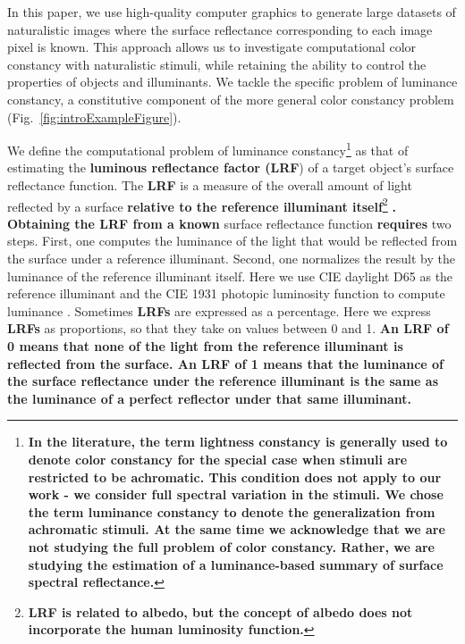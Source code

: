 \documentclass{jov}
\providecommand{\DIFaddtex}[1]{{\bf #1}} %
\providecommand{\DIFdeltex}[1]{} %
\providecommand{\DIFaddbegin}{} %
\providecommand{\DIFaddend}{} %
\providecommand{\DIFdelbegin}{} %
\providecommand{\DIFdelend}{} %
\providecommand{\DIFadd}[1]{\texorpdfstring{\DIFaddtex{#1}}{#1}} %
\providecommand{\DIFdel}[1]{\texorpdfstring{\DIFdeltex{#1}}{}} %
\newcommand{\DIFscaledelfig}{0.5}
\newlength{\DIFdelgraphicswidth} %
\newlength{\DIFdelgraphicsheight} %
\newcommand{\DIFaddincludegraphics}[2][]{{\color{blue}\fbox{\DIFOincludegraphics[#1]{#2}}}} %
\newcommand{\DIFdelincludegraphics}[2][]{%
\sbox{\DIFdelgraphicsbox}{\DIFOincludegraphics[#1]{#2}}%
\settoboxwidth{\DIFdelgraphicswidth}{\DIFdelgraphicsbox} %
\settoboxtotalheight{\DIFdelgraphicsheight}{\DIFdelgraphicsbox} %
\scalebox{\DIFscaledelfig}{%
\parbox[b]{\DIFdelgraphicswidth}{\usebox{\DIFdelgraphicsbox}\\[-\baselineskip] \rule{\DIFdelgraphicswidth}{0em}}\llap{\resizebox{\DIFdelgraphicswidth}{\DIFdelgraphicsheight}{%
\setlength{\unitlength}{\DIFdelgraphicswidth}%
\begin{picture}(1,1)%
\thicklines\linethickness{2pt} %
{\color[rgb]{1,0,0}\put(0,0){\framebox(1,1){}}}%
{\color[rgb]{1,0,0}\put(0,0){\line( 1,1){1}}}%
{\color[rgb]{1,0,0}\put(0,1){\line(1,-1){1}}}%
\end{picture}%
}\hspace*{3pt}}} %
} %
\DeclareRobustCommand{\DIFaddbegin}{\DIFOaddbegin \let\includegraphics\DIFaddincludegraphics} %
\DeclareRobustCommand{\DIFaddend}{\DIFOaddend \let\includegraphics\DIFOincludegraphics} %
\DeclareRobustCommand{\DIFdelbegin}{\DIFOdelbegin \let\includegraphics\DIFdelincludegraphics} %
\DeclareRobustCommand{\DIFdelend}{\DIFOaddend \let\includegraphics\DIFOincludegraphics} %
\begin{document}
In this paper, we use high-quality computer graphics to generate large datasets of naturalistic images where the surface reflectance corresponding to each image pixel is known. 
This approach allows us to investigate computational color constancy with naturalistic stimuli, while retaining the ability to control the properties of objects and illuminants. We tackle the specific problem of luminance constancy, a constitutive component of the more general color constancy problem (Fig.~\ref{fig:introExampleFigure}). 

We define the computational problem of luminance constancy\DIFaddbegin \footnote{\DIFadd{In the literature, the term lightness constancy is generally used to denote color constancy for the special case when stimuli are restricted to be achromatic. This condition does not apply to our work - we consider full spectral variation in the stimuli. We chose the term luminance constancy to denote the generalization from achromatic stimuli. At the same time we acknowledge that we are not studying the full problem of color constancy. Rather, we are studying the estimation of a luminance-based summary of surface spectral reflectance.}} \DIFaddend as that of estimating the \DIFdelbegin \DIFdel{light reflectance value (LRV}\DIFdelend \DIFaddbegin \DIFadd{luminous reflectance factor (LRF}\DIFaddend ) of a target object's surface reflectance function.
The \DIFdelbegin \DIFdel{LRV }\DIFdelend \DIFaddbegin \DIFadd{LRF }\DIFaddend is a measure of the overall amount of light reflected by a surface \DIFdelbegin \DIFdel{\cite{astm1121477}.
Estimating the LRV from a }\DIFdelend \DIFaddbegin \DIFadd{relative to the reference illuminant itself}\footnote{\DIFadd{LRF is related to albedo, but the concept of albedo does not incorporate the human luminosity function.}} \DIFadd{\cite{astm1121477}.
Obtaining the LRF from a known }\DIFaddend surface reflectance function \DIFdelbegin \DIFdel{proceeds in }\DIFdelend \DIFaddbegin \DIFadd{requires }\DIFaddend two steps.
First, one computes the luminance of the light that would be reflected from the surface under a reference illuminant.
Second, one normalizes the result by the luminance of the reference illuminant itself.
Here we use CIE daylight D65 as the reference illuminant and the CIE 1931 photopic luminosity function to compute luminance \cite{CIE86}.
Sometimes \DIFdelbegin \DIFdel{LRVs }\DIFdelend \DIFaddbegin \DIFadd{LRFs }\DIFaddend are expressed as a percentage.
Here we express \DIFdelbegin \DIFdel{LRVs }\DIFdelend \DIFaddbegin \DIFadd{LRFs }\DIFaddend as proportions, so that they take on values between 0 and 1. 
\DIFaddbegin \DIFadd{An LRF of 0 means that none of the light from the reference illuminant is reflected from the surface. 
An LRF of 1 means that the luminance of the surface reflectance under the reference illuminant is the same as the luminance of a perfect reflector under that same illuminant.
}\DIFaddend 
\end{document}
